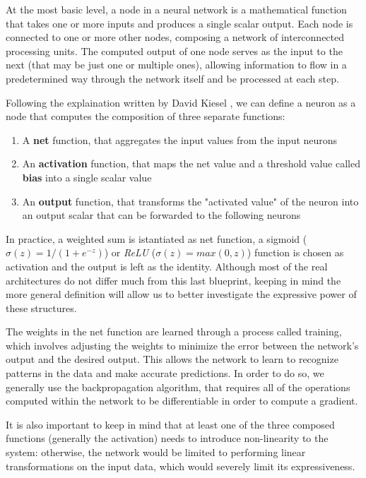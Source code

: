 \documentclass{article}
\begin{document}
At the most basic level, a node in a neural network is a mathematical function that takes one or more inputs and produces a single scalar output. Each node is connected to one or more other nodes, composing a network of interconnected processing units. The computed output of one node serves as the input to the next (that may be just one or multiple ones), allowing information to flow in a predetermined way through the network itself and be processed at each step.

Following the explaination written by David Kiesel \cite{KRI07}, we can define a neuron as a node that computes the composition of three separate functions:

\begin{enumerate}
    \item A \textbf{net} function, that aggregates the input values from the input neurons
    \item An \textbf{activation} function, that maps the net value and a threshold value called \textbf{bias} into a single scalar value
    \item An \textbf{output} function, that transforms the "activated value" of the neuron into an output scalar that can be forwarded to the following neurons
\end{enumerate}

In practice, a weighted sum is istantiated as net function, a sigmoid ($\sigma(z)=1/(1+e^{-z})$) or \textit{ReLU} ($\sigma(z) = max(0,z)$) function is chosen as activation and the output is left as the identity. Although most of the real architectures do not differ much from this last blueprint, keeping in mind the more general definition will allow us to better investigate the expressive power of these structures.

The weights in the net function are learned through a process called training, which involves adjusting the weights to minimize the error between the network's output and the desired output. This allows the network to learn to recognize patterns in the data and make accurate predictions. In order to do so, we generally use the backpropagation algorithm, that requires all of the operations computed within the network to be differentiable in order to compute a gradient.

It is also important to keep in mind that at least one of the three composed functions (generally the activation) needs to introduce non-linearity to the system: otherwise, the network would be limited to performing linear transformations on the input data, which would severely limit its expressiveness.
\end{document}
